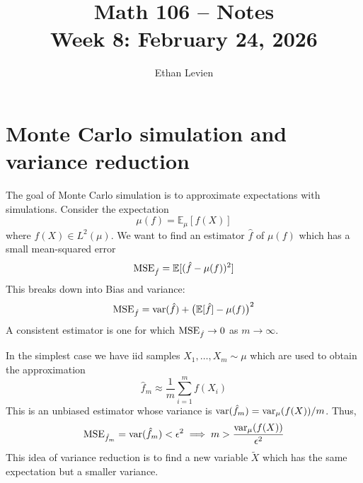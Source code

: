 \documentclass[11pt]{article}
\title{Math 106 -- Notes \\ Week 8: February 24, 2026}
\author{Ethan Levien}
\date{}
\begin{document}
\maketitle



\section*{Monte Carlo simulation and variance reduction}

The goal of Monte Carlo simulation is to approximate expectations with simulations. Consider the expectation 
\begin{equation}
\mu(f) = {\mathbb E}_{\mu}[f(X)]
\end{equation}
 where $f(X) \in L^2(\mu)$. We want to find an estimator $\hat{f}$ of $\mu(f)$ which has a small mean-squared error
 \begin{equation}
 {\rm MSE}_{\hat{f}} = {\mathbb E}[(\hat{f}-\mu(f))^2]
 \end{equation}
 This breaks down into Bias and variance: 
 \begin{equation}
  {\rm MSE}_{\hat{f}} = {\rm var}(\hat{f}) + \big({\mathbb E}[\hat{f}]-\mu(f)\big)^2
 \end{equation}
 A consistent estimator is one for which ${\rm MSE}_{\hat{f}}  \to 0$ as $m \to \infty$. 
 
 In the simplest case we have iid samples $X_1,\dots,X_m \sim \mu$ which are used to obtain the approximation 
\begin{equation}
\hat{f}_m \approx \frac{1}{m}\sum_{i=1}^mf(X_i)
\end{equation}
This is an unbiased estimator whose variance is ${\rm var}(\hat{f}_m) = {\rm var}_{\mu}(f(X))/m$. Thus, 
\begin{equation}
  {\rm MSE}_{\hat{f}_m}= {\rm var}(\hat{f}_m)< \epsilon^2 \implies  m > \frac{{\rm var}_{\mu}(f(X))}{\epsilon^2}
\end{equation}
This idea of variance reduction is to find a new variable $\tilde{X}$ which has the same expectation but a smaller variance. 
\end{document}
